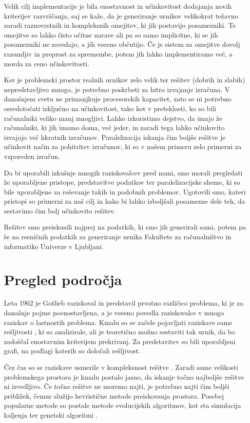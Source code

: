 \documentclass[a4paper,12pt]{book}
\begin{document}
Velik cilj implementacije je bila enostavnost in učinkovitost dodajanja novih kriterijev razvrščanja, saj se kaže, da je generiranje urnikov velikokrat težavno zaradi raznovrstnih in kompleksnih omejitev, ki jih postavijo posamezniki. Te omejitve so lahko čisto očitne narave ali pa so samo implicitne, ki se jih posamezniki ne zavedajo, a jih vseeno občutijo. Če je sistem za omejitve dovolj razumljiv in preprost za spremembe, potem jih lahko implementiramo več, a morda za ceno učinkovitosti. 

Ker je problemski prostor realnih urnikov zelo velik ter rešitev (dobrih in slabih) nepredstavljivo mnogo, je potrebno poskrbeti za hitro izvajanje izračuna. V današnjem svetu ne primanjkuje procesorskih kapacitet, zato se ni potrebno osredotočati izključno na učinkovitost, tako kot v preteklosti, ko so bili računalniki veliko manj zmogljivi. Lahko izkoristimo dejstvo, da imajo že računalniki, ki jih imamo doma, več jeder, in zaradi tega lahko učinkovito izvajajo več hkratnih izračunov. Paralelizacija iskanja čim boljše rešitve je učinkovit način za pohitritev izračunov, ki so v našem primeru zelo primerni za vzporeden izračun.

Da bi uporabili izkušnje mnogih raziskovalcev pred nami, smo morali pregledati že uporabljene pristope, predstavitve podatkov ter paralelizacijske sheme, ki so bile uporabljene za reševanje takih in podobnih problemov. Ugotovili smo, kateri pristopi so primerni za naš cilj in kako bi lahko izboljšali posamezne dele teh, da sestavimo čim bolj učinkovito rešitev. 

Rešitev smo preiskusili najprej na podatkih, ki smo jih generirali sami, potem pa še na resničnih podatkih za generiranje urnika Fakultete za računalni\-štvo in informatiko Univerze v Ljubljani. 


\section{Pregled področja}
Leta 1962 je Gotlieb raziskoval in predstavil \cite{gotlieb1962construction} prvotno različico {problema}, ki je za današnje pojme poenostavljena, a je vseeno povedla raziskovalce v mnogo raziskav o lastnostih problema. Kmalu so se začele pojavljati raziskave same rešljivosti \cite{neufeld1974graph}, ki so analizirale, ali je teoretično možno sestaviti tak urnik, da bo zadoščal enostavnim kriterijem prekrivanj. Za predstavitev so bili uporabljeni grafi, na podlagi katerih so določali rešljivost. 

Čez čas so se raziskave usmerile v kompleksnost rešitve \cite{cooper1996complexity,even1975complexity}. Zaradi same velikosti problemskega prostora je kmalu postalo jasno, da iskanje točno najboljše rešitve ni izvedljivo. Če točne rešitve ne moremo najti, je potrebno najti čim boljši približek, čemur služijo hevristične metode preiskovanja prostora. Posebej popularne metode so postale metode evolucijskih algoritmov, kot sta simulacija kaljenja ter genetski algoritmi \cite{sigl2003solving,wall1996genetic,burke1998simple,abdullah2008generating,colorni1992genetic}.
\end{document}
